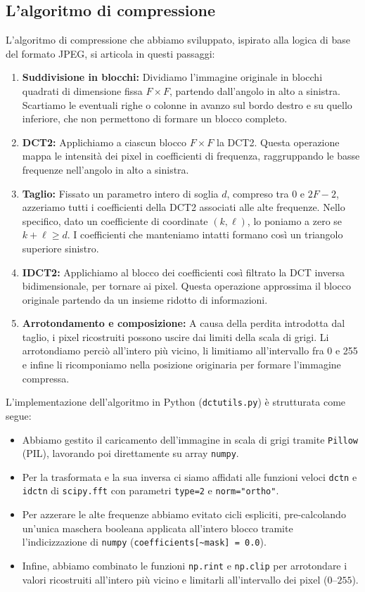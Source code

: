 \documentclass[11pt,a4paper]{article}
\makeatletter
\let\@origtexttt\texttt
\renewcommand{\texttt}[1]{{\def\_{\textunderscore\discretionary{}{}{}}\@origtexttt{#1}}}
\makeatother
\begin{document}
\subsection{L'algoritmo di compressione}

L'algoritmo di compressione che abbiamo sviluppato, ispirato alla logica di base del formato JPEG, si articola in questi passaggi:
\begin{enumerate}
    \item \textbf{Suddivisione in blocchi:} Dividiamo l'immagine originale in blocchi quadrati di dimensione fissa $F \times F$, partendo dall'angolo
    in alto a sinistra. Scartiamo le eventuali righe o colonne in avanzo sul bordo destro e su quello inferiore, che non permettono di formare un blocco
    completo.
    \item \textbf{DCT2:} Applichiamo a ciascun blocco $F \times F$ la DCT2.
    Questa operazione mappa le intensità dei pixel in coefficienti di frequenza, raggruppando le basse frequenze nell'angolo in alto a sinistra.
    \item \textbf{Taglio:} Fissato un parametro intero di soglia $d$, compreso tra $0$ e $2F-2$, azzeriamo 
    tutti i coefficienti della DCT2 associati alle alte frequenze. Nello specifico, dato un coefficiente di coordinate $(k, \ell)$, lo poniamo a zero se 
    $k + \ell \ge d$. I coefficienti che manteniamo intatti formano così un triangolo superiore sinistro.
    \item \textbf{IDCT2:} Applichiamo al blocco dei coefficienti così filtrato la DCT inversa bidimensionale, per tornare ai pixel. 
    Questa operazione approssima il blocco originale partendo da un insieme ridotto di informazioni.
    \item \textbf{Arrotondamento e composizione:} A causa della perdita introdotta dal taglio, i pixel ricostruiti possono uscire dai limiti della scala
    di grigi. Li arrotondiamo perciò all'intero più vicino, li limitiamo all'intervallo fra 0 e 255 e infine li ricomponiamo nella posizione originaria per formare l'immagine compressa.
\end{enumerate}
L'implementazione dell'algoritmo in Python (\texttt{dct\_utils.py}) è strutturata come segue:
\begin{itemize}
      \item Abbiamo gestito il caricamento dell'immagine in scala di grigi tramite \texttt{Pillow} (PIL), lavorando poi direttamente su array \texttt{numpy}.
      \item Per la trasformata e la sua inversa ci siamo affidati alle funzioni veloci \texttt{dctn} e \texttt{idctn} di \texttt{scipy.fft} con parametri \texttt{type=2} e \texttt{norm="ortho"}.    
      \item Per azzerare le alte frequenze abbiamo evitato cicli espliciti, pre-calcolando un'unica maschera booleana applicata all'intero blocco tramite l'indicizzazione di \texttt{numpy} (\texttt{coefficients[\textasciitilde mask] = 0.0}).
      \item Infine, abbiamo combinato le funzioni \texttt{np.rint} e \texttt{np.clip} per arrotondare i valori ricostruiti all'intero più vicino e limitarli all'intervallo dei pixel ($0$--$255$).
\end{itemize}
\end{document}
